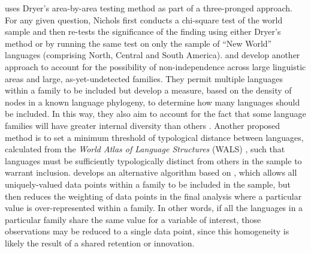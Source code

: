 \textcite[p.~41]{nichols_linguistic_1992} uses Dryer's area-by-area testing method as part of a three-pronged approach. For any given question, Nichols first conducts a chi-square test of the world sample and then re-tests the significance of the finding using either Dryer's method or by running the same test on only the sample of ``New World'' languages (comprising North, Central and South America). \textcite{rijkhoff_method_1993} and \textcite{rijkhoff_language_1998} develop another approach to account for the possibility of non-independence across large linguistic areas and large, as-yet-undetected families. They permit multiple languages within a family to be included but develop a measure, based on the density of nodes in a known language phylogeny, to determine how many languages should be included. In this way, they also aim to account for the fact that some language families will have greater internal diversity than others \autocites[see also][]{bakker_language_2011}{miestamo_sampling_2016}. Another proposed method is to set a minimum threshold of typological distance between languages, calculated from the \emph{World Atlas of Language Structures} (WALS) \autocite{dryer_wals_2013}, such that languages must be sufficiently typologically distinct from others in the sample to warrant inclusion. \textcite{bickel_refined_2009} develops an alternative algorithm based on \textcite{dryer_large_1989}, which allows all uniquely-valued data points within a family to be included in the sample, but then reduces the weighting of data points in the final analysis where a particular value is over-represented within a family. In other words, if all the languages in a particular family share the same value for a variable of interest, those observations may be reduced to a single data point, since this homogeneity is likely the result of a shared retention or innovation.


